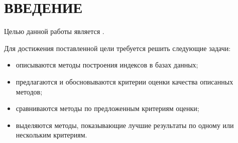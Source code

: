 \chapter*{ВВЕДЕНИЕ}


Целью данной работы является .

Для достижения поставленной цели требуется решить следующие задачи:
\begin{itemize}
    \item описываются методы построения индексов в базах данных;
    \item предлагаются и обосновываются критерии оценки качества описанных методов;
    \item сравниваются методы по предложенным критериям оценки;
    \item выделяются методы, показывающие лучшие результаты по одному или
        нескольким критериям.
\end{itemize}

